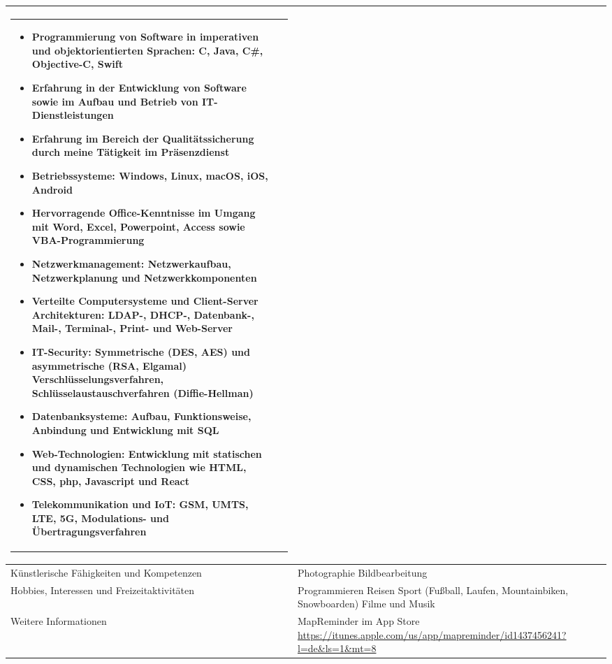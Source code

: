 \begin{longtable}{p{}|p{}}
\begin{tabular} {m{} m{} }
\begin{itemize}[nosep,leftmargin=1em]
	\item Programmierung von Software in imperativen und objektorientierten Sprachen: C, Java, C\#, Objective-C, Swift
	\item Erfahrung in der Entwicklung von Software sowie im Aufbau und Betrieb von IT-Dienstleistungen
	\item Erfahrung im Bereich der Qualitätssicherung durch meine Tätigkeit im Präsenzdienst
	\item Betriebssysteme: Windows, Linux, macOS, iOS, Android
	\item Hervorragende Office-Kenntnisse im Umgang mit Word, Excel, Powerpoint, Access sowie VBA-Programmierung
	\item Netzwerkmanagement: Netzwerkaufbau, Netzwerkplanung und Netzwerkkomponenten
	\item Verteilte Computersysteme und Client-Server Architekturen: LDAP-, DHCP-, Datenbank-, Mail-, Terminal-, Print- und Web-Server
	\item IT-Security: Symmetrische (DES, AES) und asymmetrische (RSA, Elgamal) Verschlüsselungsverfahren, Schlüsselaustauschverfahren (Diffie-Hellman)
	\item Datenbanksysteme: Aufbau, Funktionsweise, Anbindung und Entwicklung mit SQL
	\item Web-Technologien: Entwicklung mit statischen und dynamischen Technologien wie HTML, CSS, php, Javascript und React
	\item Telekommunikation und IoT: GSM, UMTS, LTE, 5G, Modulations- und Übertragungsverfahren %
	\end{itemize}
	\end{tabular}
	\\
	\bottomrule
	Künstlerische Fähigkeiten und Kompetenzen &
	\tabitem Photographie \newline
	\tabitem Bildbearbeitung \\ \bottomrule
	Hobbies, Interessen und Freizeitaktivitäten &
	\tabitem Programmieren \newline
	\tabitem Reisen \newline
	\tabitem Sport (Fußball, Laufen, Mountainbiken, Snowboarden) \newline
	\tabitem Filme und Musik \\ \bottomrule
	Weitere Informationen &
	MapReminder im App Store \newline
	\small{\url{https://itunes.apple.com/us/app/mapreminder/id1437456241?l=de&ls=1&mt=8}} \newline

\end{longtable}
